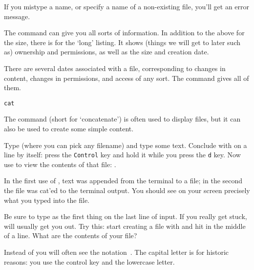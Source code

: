 \begin{caution}
  If you mistype a name, or specify a name of a
  non-existing file, you'll get an error message.
\end{caution}

The  command can give you all sorts of information.
In addition to the above  for the size, there is
 for the `long' listing.
It shows (things we will get to later such as) ownership and permissions,
as well as the size and creation date.

\begin{remark}
  There are several dates associated with a file, corresponding to
  changes in content, changes in permissions, and access of any
  sort. The  command gives all of them.
\end{remark}

 {\texttt{cat}}

The  command (short for `concatenate')
is often used to display files, but it can also be
used to create some simple content. 

\begin{exercise}
  Type  (where you can pick any filename) and
  type some text. Conclude with  on a line by
  itself: press the \texttt{Control} key and hold it while you
  press the \texttt{d} key.  Now use  to view the
  contents of that file: .
\end{exercise}
\begin{outcome}
  In the first use of , text was appended
  from the terminal to a file; in the second the file was cat'ed to
  the terminal output. You should see on your screen precisely what
  you typed into the file.
\end{outcome}
\begin{caution}
  Be sure to type  as the first thing on the last line of input. If you
    really get stuck,  will usually get you out. Try this:
    start creating a file with  and hit  in
    the middle of a line. What are the contents of your file?
\end{caution}

\begin{remark}
  Instead of  you will often see the notation~. 
  The capital letter is for historic reasons: you use the control key
  and the lowercase letter.
\end{remark}

